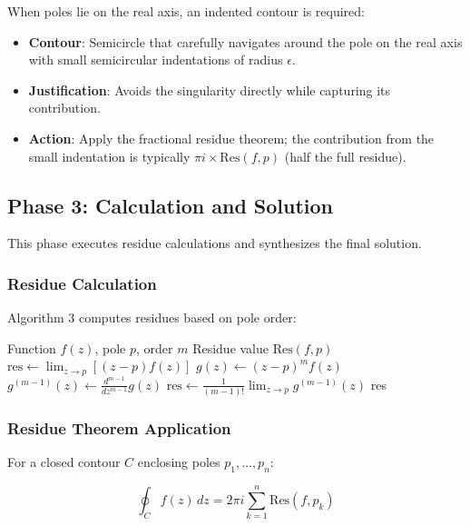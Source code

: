 \documentclass[conference]{IEEEtran}
\begin{document}
When poles lie on the real axis, an indented contour is required:

\begin{itemize}
    \item \textbf{Contour}: Semicircle that carefully navigates around the pole on the real axis with small semicircular indentations of radius $\epsilon$.
    \item \textbf{Justification}: Avoids the singularity directly while capturing its contribution.
    \item \textbf{Action}: Apply the fractional residue theorem; the contribution from the small indentation is typically $\pi i \times \text{Res}(f, p)$ (half the full residue).
\end{itemize}

\subsection{Phase 3: Calculation and Solution}

This phase executes residue calculations and synthesizes the final solution.

\subsubsection{Residue Calculation}

Algorithm 3 computes residues based on pole order:

\begin{algorithm}[h]
\caption{Residue Calculation}
\begin{algorithmic}[1]
\REQUIRE Function $f(z)$, pole $p$, order $m$
\ENSURE Residue value $\text{Res}(f, p)$
    \STATE $\text{res} \gets \lim_{z \to p} [(z-p)f(z)]$
\ELSE
    \STATE $g(z) \gets (z-p)^m f(z)$
    \STATE $g^{(m-1)}(z) \gets \frac{d^{m-1}}{dz^{m-1}} g(z)$
    \STATE $\text{res} \gets \frac{1}{(m-1)!} \lim_{z \to p} g^{(m-1)}(z)$
\ENDIF
\RETURN res
\end{algorithmic}
\end{algorithm}

\subsubsection{Residue Theorem Application}

For a closed contour $C$ enclosing poles $p_1, \ldots, p_n$:

\begin{equation}
\oint_C f(z) \, dz = 2\pi i \sum_{k=1}^{n} \text{Res}(f, p_k)
\end{equation}
\end{document}
